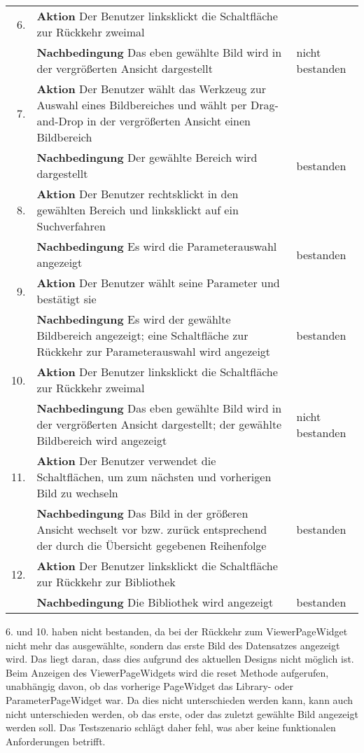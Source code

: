 \begin{enumerate} [label=\bfseries /TS \arabic*0/, leftmargin=*]
	\begin{tabular}{@{}rp{4in}|l}
	6. & \textbf{Aktion} Der Benutzer linksklickt die Schaltfläche zur Rückkehr zweimal & \\
	   & \textbf{Nachbedingung}	Das eben gewählte Bild wird in der vergrößerten Ansicht dargestellt & nicht bestanden\\
	\hline
	7. & \textbf{Aktion} Der Benutzer wählt das Werkzeug zur Auswahl eines Bildbereiches und wählt per Drag-and-Drop in der vergrößerten Ansicht einen Bildbereich & \\
	   & \textbf{Nachbedingung} Der gewählte Bereich wird dargestellt & bestanden \\
	\hline	
	8. & \textbf{Aktion} Der Benutzer rechtsklickt in den gewählten Bereich und linksklickt auf ein Suchverfahren & \\
	   & \textbf{Nachbedingung} Es wird die Parameterauswahl angezeigt & bestanden \\
	\hline	
	9. & \textbf{Aktion} Der Benutzer wählt seine Parameter und bestätigt sie & \\
	   & \textbf{Nachbedingung} Es wird der gewählte Bildbereich angezeigt; eine Schaltfläche zur Rückkehr zur Parameterauswahl wird angezeigt & bestanden \\
	\hline   
   10. & \textbf{Aktion} Der Benutzer linksklickt die Schaltfläche zur Rückkehr zweimal & \\
	   & \textbf{Nachbedingung} Das eben gewählte Bild wird in der vergrößerten Ansicht dargestellt; der gewählte Bildbereich wird angezeigt & nicht bestanden \\
	\hline
   11. & \textbf{Aktion} Der Benutzer verwendet die Schaltflächen, um zum nächsten und vorherigen Bild zu wechseln & \\
	   & \textbf{Nachbedingung} Das Bild in der größeren Ansicht wechselt vor bzw. zurück entsprechend der durch die Übersicht gegebenen Reihenfolge & bestanden \\
	\hline
   12. & \textbf{Aktion} Der Benutzer linksklickt die Schaltfläche zur Rückkehr zur Bibliothek & \\
	   & \textbf{Nachbedingung} Die Bibliothek wird angezeigt & bestanden \\
	\end{tabular}
	\par
6. und 10. haben nicht bestanden, da bei der Rückkehr zum ViewerPageWidget nicht mehr das ausgewählte, sondern das erste Bild des Datensatzes angezeigt wird. Das liegt daran, dass dies aufgrund des aktuellen Designs nicht möglich ist. Beim Anzeigen des ViewerPageWidgets wird die reset Methode aufgerufen, unabhängig davon, ob das vorherige PageWidget das Library- oder ParameterPageWidget war. Da dies nicht unterschieden werden kann, kann auch nicht unterschieden werden, ob das erste, oder das zuletzt gewählte Bild angezeigt werden soll. Das Testszenario schlägt daher fehl, was aber keine funktionalen Anforderungen betrifft. 
	\pagebreak


\end{enumerate}

